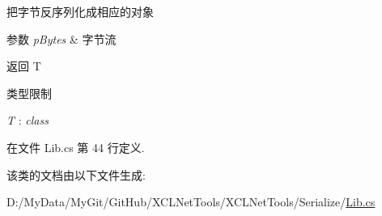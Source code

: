 把字节反序列化成相应的对象 


\begin{DoxyParams}{参数}
{\em p\-Bytes} & 字节流\\
\hline
\end{DoxyParams}
\begin{DoxyReturn}{返回}
T
\end{DoxyReturn}
\begin{Desc}
\item[类型限制]\begin{description}
\item[{\em T} : {\em class}]\end{description}
\end{Desc}


在文件 Lib.\-cs 第 44 行定义.



该类的文档由以下文件生成\-:\begin{DoxyCompactItemize}
\item 
D\-:/\-My\-Data/\-My\-Git/\-Git\-Hub/\-X\-C\-L\-Net\-Tools/\-X\-C\-L\-Net\-Tools/\-Serialize/\hyperlink{_serialize_2_lib_8cs}{Lib.\-cs}\end{DoxyCompactItemize}
